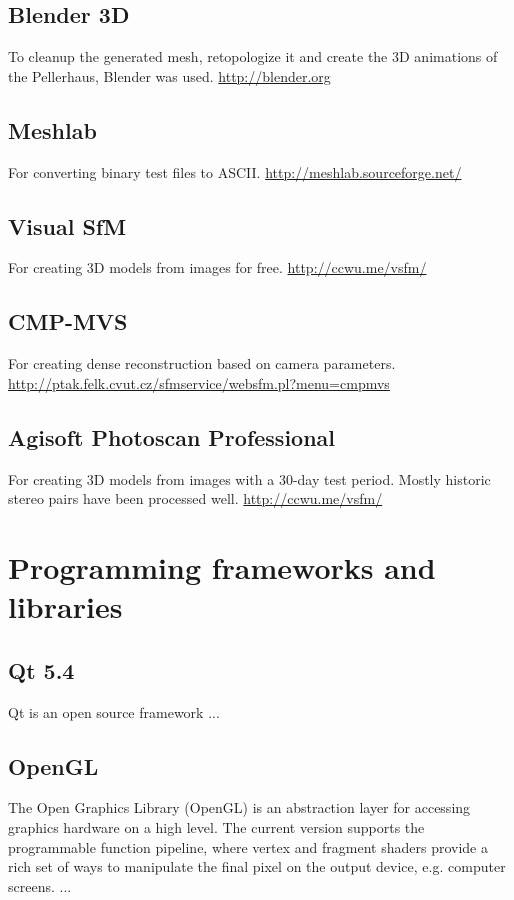 \subsection{Blender 3D}
To cleanup the generated mesh, retopologize it and create the 3D animations of the Pellerhaus, Blender was used. \url{http://blender.org}

\subsection{Meshlab}
For converting binary test files to ASCII. \url{http://meshlab.sourceforge.net/}

\subsection{Visual SfM}
For creating 3D models from images for free. \url{http://ccwu.me/vsfm/}

\subsection{CMP-MVS}
For creating dense reconstruction based on camera parameters. \url{http://ptak.felk.cvut.cz/sfmservice/websfm.pl?menu=cmpmvs}

\subsection{Agisoft Photoscan Professional}
For creating 3D models from images with a 30-day test period. Mostly historic stereo pairs have been processed well. \url{http://ccwu.me/vsfm/}





\section{Programming frameworks and libraries}

\subsection{Qt 5.4}

Qt is an open source framework ...

\subsection{OpenGL}

The Open Graphics Library (OpenGL) is an abstraction layer for accessing graphics hardware on a high level. The current version supports the programmable function pipeline, where vertex and fragment shaders provide a rich set of ways to manipulate the final pixel on the output device, e.g. computer screens. ...


